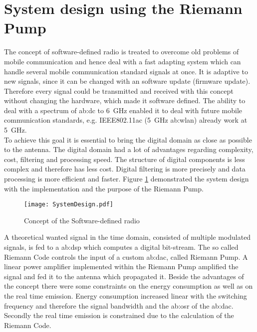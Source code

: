 \section{System design using the Riemann Pump}
The concept of software-defined radio is treated to overcome old problems of mobile communication and hence deal with a fast adapting system which can handle several mobile communication standard signals at once. 
It is adaptive to new signals, since it can be changed with an software update (firmware update).
Therefore every signal could be transmitted and received with this concept without changing the hardware, which made it software defined.
The ability to deal with a spectrum of \gls{ab:dc} to \SI{6}{\giga \hertz} enabled it to deal with future mobile communication standards, e.g. IEEE802.11ac (\SI{5}{\giga \hertz} \gls{ab:wlan}) already work at \SI{5}{\giga \hertz}.\\
To achieve this goal it is essential to bring the digital domain as close as possible to the antenna.
The digital domain had a lot of advantages regarding complexity, cost, filtering and processing speed.
The structure of digital components is less complex and therefore has less cost.
Digital filtering is more precisely and data processing is more efficient and faster.
Figure \ref{fig:System} demonstrated the system design with the implementation and the purpose of the Riemann Pump.

\begin{figure}[ht]
	\centering
  \texttt{[image: SystemDesign.pdf]}
	\caption{Concept of the Software-defined radio}
	\label{fig:System}
\end{figure}

A theoretical wanted signal in the time domain, consisted of multiple modulated signals, is fed to a \gls{ab:dsp} which computes a digital bit-stream.
The so called Riemann Code controls the input of a custom \gls{ab:dac}, called Riemann Pump.
A linear power amplifier implemented within the Riemann Pump amplified the signal and fed it to the antenna which propagated it.
Beside the advantages of the concept there were some constraints on the energy consumption as well as on the real time emission.
Energy consumption increased linear with the switching frequency and therefore the signal bandwidth and the \gls{ab:osr} of the \gls{ab:dac}.
Secondly the real time emission is constrained due to the calculation of the Riemann Code.

